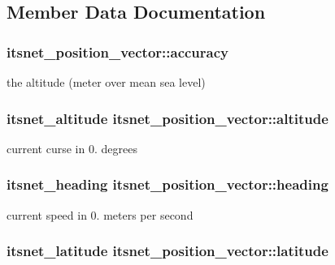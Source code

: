 \subsection{\-Member \-Data \-Documentation}
\hypertarget{structitsnet__position__vector_a5bc5e07a112a28987fb7bf612648ff21}{
\subsubsection[{accuracy}]{ {\bf itsnet\-\_\-position\-\_\-vector\-::accuracy}}}\label{structitsnet__position__vector_a5bc5e07a112a28987fb7bf612648ff21}
the altitude (meter over mean sea level) \hypertarget{structitsnet__position__vector_a1fe86b14da3126d860a211b612d63753}{
\subsubsection[{altitude}]{\setlength{\rightskip}{0pt plus 5cm}itsnet\-\_\-altitude {\bf itsnet\-\_\-position\-\_\-vector\-::altitude}}}\label{structitsnet__position__vector_a1fe86b14da3126d860a211b612d63753}
current curse in 0. degrees \hypertarget{structitsnet__position__vector_a896906d084fb63af3c0ca06c5e6f1bdc}{
\subsubsection[{heading}]{\setlength{\rightskip}{0pt plus 5cm}itsnet\-\_\-heading {\bf itsnet\-\_\-position\-\_\-vector\-::heading}}}\label{structitsnet__position__vector_a896906d084fb63af3c0ca06c5e6f1bdc}
current speed in 0. meters per second \hypertarget{structitsnet__position__vector_a1c0bd70cd8db169a923817257e495cc4}{
\subsubsection[{latitude}]{\setlength{\rightskip}{0pt plus 5cm}itsnet\-\_\-latitude {\bf itsnet\-\_\-position\-\_\-vector\-::latitude}}}\label{structitsnet__position__vector_a1c0bd70cd8db169a923817257e495cc4}
